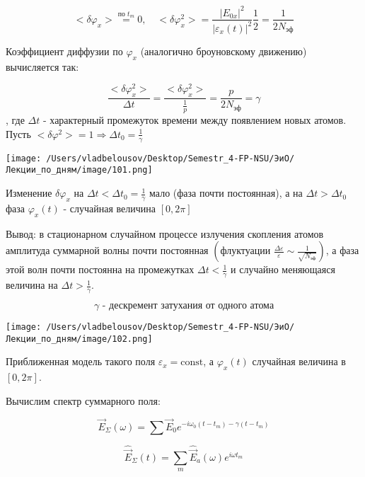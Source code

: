 \documentclass[12pt, a4paper]{report}
\begin{document}
\[ <\delta \varphi_x > \overset{\text{по } t_m }{=} 0 , \quad  <\delta \varphi _ x ^2 > = \frac{|E_{0x } | ^2 }{|\varepsilon_x (t )| ^2 } \frac{1}{2 } = \frac{1}{2 N_{\text{эф} } }    \] 

Коэффициент диффузии по \( \varphi_x \) (аналогично броуновскому движению) вычисляется так: 

\[ \frac{<\delta \varphi_ x  ^2 >}{\Delta t } = \frac{<\delta \varphi _x ^2 >}{\frac{1 }{p } } = \frac{p}{2N_{\text{эф} } } =   \gamma  \] 
, где \( \Delta t \) - характерный промежуток времени между появлением новых атомов. Пусть \( \displaystyle <\delta \varphi ^2 > = 1 \Rightarrow \Delta t_0 = \frac{1}{\gamma}  \) 

\begin{center}
    \texttt{[image: /Users/vladbelousov/Desktop/Semestr\_4-FP-NSU/ЭиО/Лекции\_по\_дням/image/101.png]}
\end{center} 

Изменение \( \delta \varphi_x  \) на  \( \displaystyle \Delta t < \Delta t_0 = \frac{1}{\gamma }   \) мало (фаза почти постоянная), а на \( \Delta t  > \Delta t_0  \) фаза \( \varphi _x (t )  \) - случайная величина \( [0, 2\pi ] \)  

Вывод: в стационарном случайном процессе излучения скопления атомов амплитуда суммарной волны почти постоянная  \( \left( \text{флуктуации }  \displaystyle  \frac{\Delta \varepsilon }{\varepsilon }\sim \frac{1}{\sqrt{N_{\text{эф} } }} \right)   \), а фаза этой волн почти постоянна на промежутках \( \displaystyle  \Delta t < \frac{1}{\gamma }  \) и случайно меняющаяся величина на \( \displaystyle  \Delta t > \frac{1}{\gamma }  \). 

\[ \gamma \text{ - дескремент затухания от одного атома}  \] 

\begin{center}
    \texttt{[image: /Users/vladbelousov/Desktop/Semestr\_4-FP-NSU/ЭиО/Лекции\_по\_дням/image/102.png]}
\end{center} 

Приближенная модель такого поля  \( \varepsilon _x = \mathrm{const }   \), а \( \varphi _ x (t )  \)   случайная величина в \( [ 0 ,2 \pi] \).

Вычислим спектр суммарного поля: 

\[ \vec{E } _{\Sigma } (\omega ) = \sum   \vec{E }  _ 0 e^{ - i \omega_0 (t -t_m )- \gamma(t- t_m)}   \] 

\[ \hat{\vec{E } } _{\Sigma } (t ) = \sum_{m }\hat{\vec{E }}   _ a(\omega ) e^{i \omega t_m}     \] 
\end{document}
